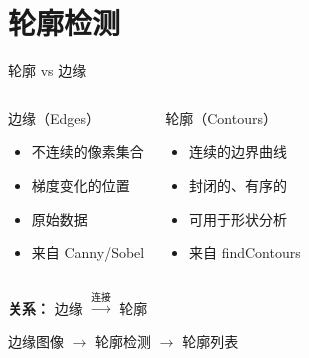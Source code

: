 
\section{轮廓检测}

\begin{frame}{轮廓 vs 边缘}
    \begin{columns}
        \begin{block}{边缘（Edges）}
            \begin{itemize}
                \item 不连续的像素集合
                \item 梯度变化的位置
                \item 原始数据
                \item 来自 Canny/Sobel
            \end{itemize}
        \end{block}

        \begin{block}{轮廓（Contours）}
            \begin{itemize}
                \item 连续的边界曲线
                \item 封闭的、有序的
                \item 可用于形状分析
                \item 来自 findContours
            \end{itemize}
        \end{block}
    \end{columns}

    \vspace{0.5cm}

    \textbf{关系：} 边缘 $\xrightarrow{\text{连接}}$ 轮廓

    \vspace{0.3cm}

    \begin{center}
        边缘图像 $\rightarrow$ 轮廓检测 $\rightarrow$ 轮廓列表
    \end{center}
\end{frame}

